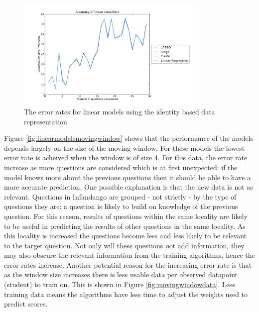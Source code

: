 \begin{figure}[b!]
\centering
\includegraphics[width=0.8\textwidth]{images/linearmodelsidentified.png}
\caption{The error rates for linear models using the identity based data representation}
\label{fig:linearmodelsidentified}
\end{figure}

Figure \ref{fig:linearmodelsmovingwindow} shows that the performance of the models depends largely on the size of the moving window. For these models the lowest error rate is acheived when the window is of size 4. For this data, the error rate increase as more questions are considered which is at first unexpected: if the model knows more about the previous questions then it should be able to have a more accurate prediction. 
One possible explanation is that the new data is not as relevant. Questions in Infandango are grouped - not strictly - by the type of questions they are: a question is likely to build on knowledge of the previous question. For this reason, results of questions within the same locality are likely to be useful in predicting the results of other questions in the same locality. As this locality is increased the questions become less and less likely to be relevant to the target question. Not only will these questions {\textit not add} information, they may also obscure the relevant information from the training algorithms, hence the error rates increase.
Another potential reason for the increasing error rate is that as the window size increases there is less usable data per observed datapoint (student) to train on. This is shown in Figure \ref{fig:movingwindowdata}. Less training data means the algorithms have less time to adjust the weights used to predict scores.

